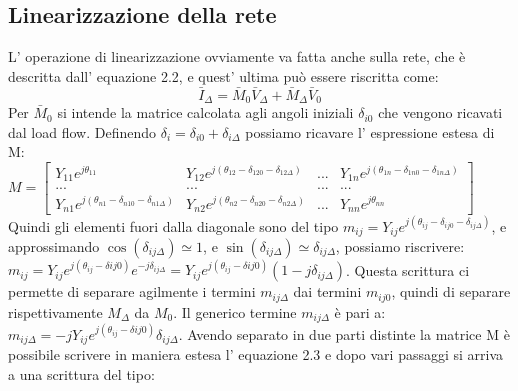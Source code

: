 \documentclass[Lau,noexaminfo]{sapthesis}
\begin{document}
	\subsection{Linearizzazione della rete}
	L' operazione di linearizzazione ovviamente va fatta anche sulla rete, che è descritta dall' equazione 2.2, e quest' ultima può essere riscritta come:\\
	\begin{equation}
	\bar{I}_\Delta=\bar{M}_0\bar{V}_\Delta+\bar{M}_\Delta\bar{V}_0
	\end{equation}
	Per $\bar{M}_0$ si intende la matrice calcolata agli angoli iniziali $\delta_{i0}$ che vengono ricavati dal load flow. Definendo $\delta_i=\delta_{i0}+\delta_{i\Delta}$ possiamo ricavare l' espressione estesa di M:\\
	$M=\begin{bmatrix}
	Y_{11}e^{j\theta_{11}} & Y_{12}e^{j(\theta_{12}-\delta_{120}-\delta_{12\Delta})} & ... & Y_{1n}e^{j(\theta_{1n}-\delta_{1n0}-\delta_{1n\Delta})}\\
	... & ... & ... & ...\\
	Y_{n1}e^{j(\theta_{n1}-\delta_{n10}-\delta_{n1\Delta})} & Y_{n2}e^{j(\theta_{n2}-\delta_{n20}-\delta_{n2\Delta})} & ... & Y_{nn}e^{j\theta_{nn}}
	\end{bmatrix}$\\
	Quindi gli elementi fuori dalla diagonale sono del tipo $m_{ij}=Y_{ij}e^{j(\theta_{ij}-\delta_{ij0}-\delta_{ij\Delta})}$, e approssimando $\cos(\delta_{ij\Delta})\simeq 1$, e $\sin(\delta_{ij\Delta})\simeq \delta_{ij\Delta}$, possiamo riscrivere:\\
	$m_{ij}=Y_{ij}e^{j(\theta_{ij}-\delta{ij0})}e^{-j\delta_{ij\Delta}}=Y_{ij}e^{j(\theta_{ij}-\delta{ij0})}(1-j\delta_{ij\Delta})$. Questa scrittura ci permette di separare agilmente i termini $m_{ij\Delta}$ dai termini $m_{ij0}$, quindi di separare rispettivamente $M_\Delta$ da $M_0$. Il generico termine $m_{ij\Delta}$ è pari a:\\ $m_{ij\Delta}=-jY_{ij}e^{j(\theta_{ij}-\delta{ij0})}\delta_{ij\Delta}$. Avendo separato in due parti distinte la matrice M è possibile scrivere in maniera estesa l' equazione 2.3 e dopo vari passaggi si arriva a una scrittura del tipo:\\
\end{document}
